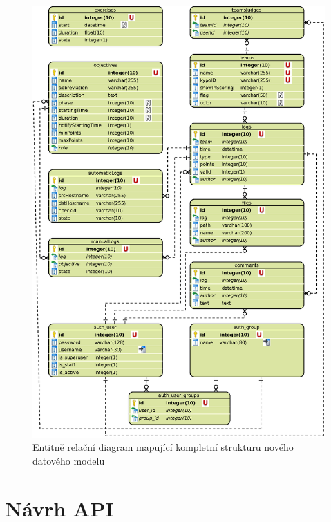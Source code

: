\documentclass[
  digital, %
  twoside, %
  table,   %
  nolof,     %
  nolot,     %
]{fithesis3}
\begin{document}
\begin{figure}
    \centering
    \includegraphics[width=12.5cm]{images/ERD-new-app.eps}
    \caption{Entitně relační diagram mapující kompletní strukturu nového datového modelu}
    \label{fig:erdNewApp}
\end{figure}

\newpage

\section{Návrh API}
\end{document}
